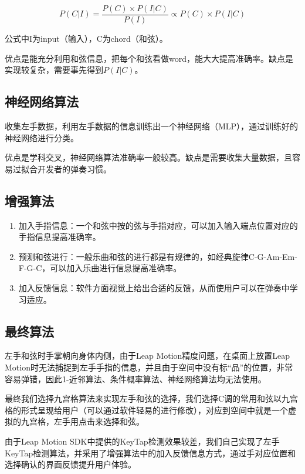         $$P(C|I)=\frac{P(C) \times P(I|C)}{P(I)}\propto P(C)\times P(I|C)$$

        公式中I为input（输入），C为chord（和弦）。

        优点是能充分利用和弦信息，把每个和弦看做word，能大大提高准确率。缺点是实现较复杂，需要事先得到$P(I|C)$。

        \subsection{神经网络算法}

        收集左手数据，利用左手数据的信息训练出一个神经网络（MLP），通过训练好的神经网络进行分类。

        优点是学科交叉，神经网络算法准确率一般较高。缺点是需要收集大量数据，且容易过拟合开发者的弹奏习惯。

        \subsection{增强算法}

        \begin{enumerate}
            \item{加入手指信息}：一个和弦中按的弦与手指对应，可以加入输入端点位置对应的手指信息提高准确率。
            \item{预测和弦进行}：一般乐曲和弦的进行都是有规律的，如经典旋律C-G-Am-Em-F-G-C，可以加入乐曲进行信息提高准确率。
            \item{加入反馈信息}：软件方面视觉上给出合适的反馈，从而使用户可以在弹奏中学习适应。
        \end{enumerate}

        \subsection{最终算法}

        左手和弦时手掌朝向身体内侧，由于Leap Motion精度问题，在桌面上放置Leap Motion时无法捕捉到左手手指的信息，并且由于空间中没有标“品”的位置，非常容易弹错，因此1-近邻算法、条件概率算法、神经网络算法均无法使用。

        最终我们选择九宫格算法来实现左手和弦的选择，我们选择C调的常用和弦以九宫格的形式呈现给用户（可以通过软件轻易的进行修改），对应到空间中就是一个虚拟的九宫格，左手用点击来选择和弦。

        由于Leap Motion SDK中提供的KeyTap检测效果较差，我们自己实现了左手KeyTap检测算法，并采用了增强算法中的加入反馈信息方式，通过手对应位置和选择确认的界面反馈提升用户体验。

